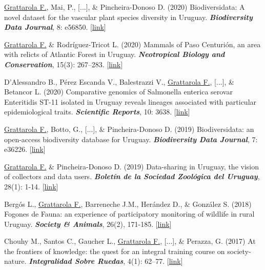 \documentclass[9pt]{developercv} %
\begin{document}
\begin{etaremune}
\item \underline{Grattarola F.}, Mai, P., [...], \& Pincheira-Donoso D. (2020) Biodiversidata: A novel dataset for the vascular plant species diversity in Uruguay. \textit{\textbf{Biodiversity Data Journal}}, 8: e56850. [\href{https://doi.org/10.3897/BDJ.8.e56850}{link}]

\item \underline{Grattarola F.} \& Rodríguez-Tricot L. (2020) Mammals of Paso Centurión, an area with relicts of Atlantic Forest in Uruguay. \textit{\textbf{Neotropical Biology and Conservation}}, 15(3): 267–283. [\href{https://doi.org/10.3897/neotropical.15.e53062}{link}]

\item D’Alessandro B., Pérez Escanda V., Balestrazzi V., \underline{Grattarola F.}, [...], \& Betancor L.  (2020) Comparative genomics of Salmonella enterica serovar Enteritidis ST-11 isolated in Uruguay reveals lineages associated with particular epidemiological traits. \textit{\textbf{Scientific Reports}}, 10: 3638. [\href{https://doi.org/10.1038/s41598-020-60502-8}{link}]

\item \underline{Grattarola F.}, Botto, G., [...], \& Pincheira-Donoso D. (2019) Biodiversidata: an open-access biodiversity database for Uruguay. \textit{\textbf{Biodiversity Data Journal}}, 7: e36226. [\href{https://doi.org/10.3897/BDJ.7.e36226}{link}]

\item \underline{Grattarola F.} \& Pincheira-Donoso D. (2019) Data-sharing in Uruguay, the vision of collectors and data users. \textit{\textbf{Boletín de la Sociedad Zoológica del Uruguay}}, 28(1): 1-14. [\href{https://doi.org/10.26462/28.1.1}{link}]

\item Bergós L., \underline{Grattarola F.}, Barreneche J.M., Herández D., \& González S. (2018) Fogones de Fauna: an experience of participatory monitoring of wildlife in rural Uruguay. \textit{\textbf{Society \& Animals}}, 26(2), 171-185. [\href{https://doi.org/10.1163/15685306-12341497}{link}]

\item Chouhy M., Santos C., Gaucher L., \underline{Grattarola F.}, [...], \& Perazza, G. (2017) At the frontiers of knowledge: the quest for an integral training course on society-nature. \textit{\textbf{Integralidad Sobre Ruedas}}, 4(1): 62–77. [\href{https://ojs.fhce.edu.uy/index.php/insoru/article/view/234}{link}]


\end{etaremune}
\end{document}
